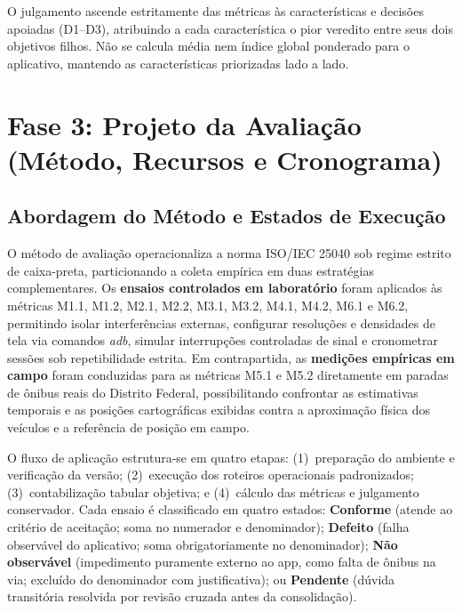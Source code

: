 \documentclass[11pt,a4paper]{article}
\begin{document}
O julgamento ascende estritamente das métricas às características e decisões apoiadas (D1--D3), atribuindo a cada característica o pior veredito entre seus dois objetivos filhos. Não se calcula média nem índice global ponderado para o aplicativo, mantendo as características priorizadas lado a lado.

\section{Fase 3: Projeto da Avaliação (Método, Recursos e Cronograma)}
\label{sec:fase3}

\subsection{Abordagem do Método e Estados de Execução}
\label{sec:metodo_estrategia}

O método de avaliação operacionaliza a norma ISO/IEC 25040 sob regime estrito de caixa-preta, particionando a coleta empírica em duas estratégias complementares. Os \textbf{ensaios controlados em laboratório} foram aplicados às métricas M1.1, M1.2, M2.1, M2.2, M3.1, M3.2, M4.1, M4.2, M6.1 e M6.2, permitindo isolar interferências externas, configurar resoluções e densidades de tela via comandos \textit{adb}, simular interrupções controladas de sinal e cronometrar sessões sob repetibilidade estrita. Em contrapartida, as \textbf{medições empíricas em campo} foram conduzidas para as métricas M5.1 e M5.2 diretamente em paradas de ônibus reais do Distrito Federal, possibilitando confrontar as estimativas temporais e as posições cartográficas exibidas contra a aproximação física dos veículos e a referência de posição em campo.

O fluxo de aplicação estrutura-se em quatro etapas: (1)~preparação do ambiente e verificação da versão; (2)~execução dos roteiros operacionais padronizados; (3)~contabilização tabular objetiva; e (4)~cálculo das métricas e julgamento conservador. Cada ensaio é classificado em quatro estados: \textbf{Conforme} (atende ao critério de aceitação; soma no numerador e denominador); \textbf{Defeito} (falha observável do aplicativo; soma obrigatoriamente no denominador); \textbf{Não observável} (impedimento puramente externo ao app, como falta de ônibus na via; excluído do denominador com justificativa); ou \textbf{Pendente} (dúvida transitória resolvida por revisão cruzada antes da consolidação).
\end{document}
